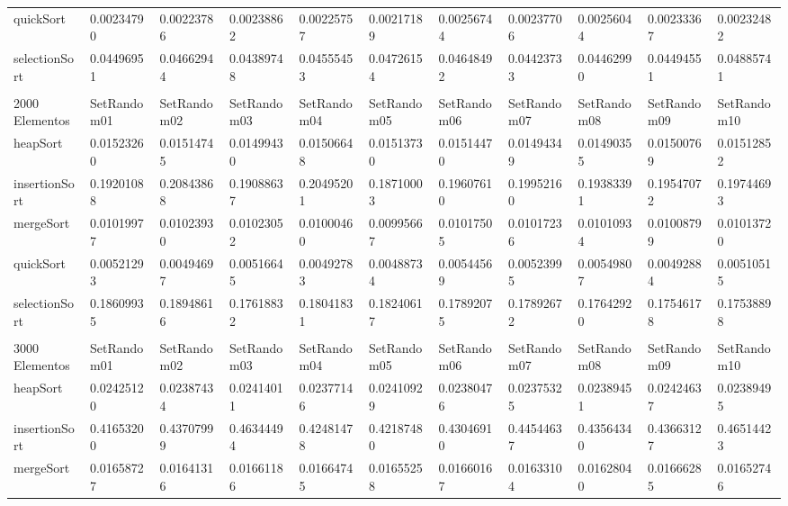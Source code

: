 \documentclass[article,a4paper]{article}
\begin{document}
\begin{table}[h]
{\begin{tabular}{lllllllllll}
quickSort       & 0.00234790  & 0.00223786  & 0.00238862  & 0.00225757  & 0.00217189  & 0.00256744  & 0.00237706  & 0.00256044  & 0.00233367  & 0.00232482  \\
selectionSort   & 0.04496951  & 0.04662944  & 0.04389748  & 0.04555453  & 0.04726154  & 0.04648492  & 0.04423733  & 0.04462990  & 0.04494551  & 0.04885741  \\
                &             &             &             &             &             &             &             &             &             &             \\
2000 Elementos  & SetRandom01 & SetRandom02 & SetRandom03 & SetRandom04 & SetRandom05 & SetRandom06 & SetRandom07 & SetRandom08 & SetRandom09 & SetRandom10 \\
heapSort        & 0.01523260  & 0.01514745  & 0.01499430  & 0.01506648  & 0.01513730  & 0.01514470  & 0.01494349  & 0.01490355  & 0.01500769  & 0.01512852  \\
insertionSort   & 0.19201088  & 0.20843868  & 0.19088637  & 0.20495201  & 0.18710003  & 0.19607610  & 0.19952160  & 0.19383391  & 0.19547072  & 0.19744693  \\
mergeSort       & 0.01019977  & 0.01023930  & 0.01023052  & 0.01000460  & 0.00995667  & 0.01017505  & 0.01017236  & 0.01010934  & 0.01008799  & 0.01013720  \\
quickSort       & 0.00521293  & 0.00494697  & 0.00516645  & 0.00492783  & 0.00488734  & 0.00544569  & 0.00523995  & 0.00549807  & 0.00492884  & 0.00510515  \\
selectionSort   & 0.18609935  & 0.18948616  & 0.17618832  & 0.18041831  & 0.18240617  & 0.17892075  & 0.17892672  & 0.17642920  & 0.17546178  & 0.17538898  \\
                &             &             &             &             &             &             &             &             &             &             \\
3000 Elementos  & SetRandom01 & SetRandom02 & SetRandom03 & SetRandom04 & SetRandom05 & SetRandom06 & SetRandom07 & SetRandom08 & SetRandom09 & SetRandom10 \\
heapSort        & 0.02425120  & 0.02387434  & 0.02414011  & 0.02377146  & 0.02410929  & 0.02380476  & 0.02375325  & 0.02389451  & 0.02424637  & 0.02389495  \\
insertionSort   & 0.41653200  & 0.43707999  & 0.46344494  & 0.42481478  & 0.42187480  & 0.43046910  & 0.44544637  & 0.43564340  & 0.43663127  & 0.46514423  \\
mergeSort       & 0.01658727  & 0.01641316  & 0.01661186  & 0.01664745  & 0.01655258  & 0.01660167  & 0.01633104  & 0.01628040  & 0.01666285  & 0.01652746  \\

\end{tabular}}
\end{table}
\end{document}
